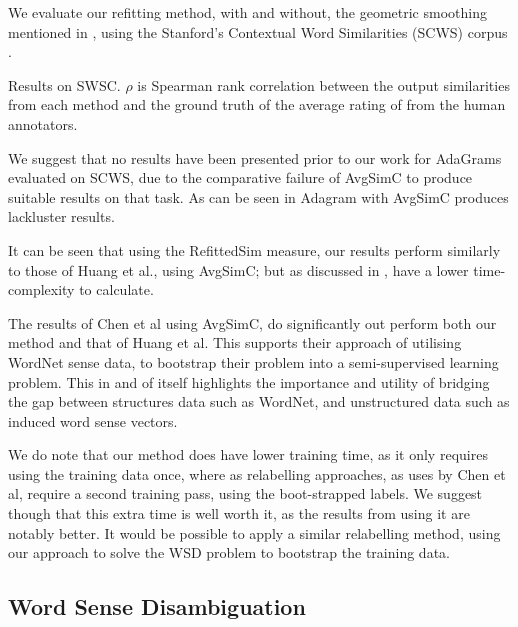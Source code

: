 \documentclass{sig-alternate}
\begin{document}
We evaluate our refitting method, with and without, the geometric smoothing mentioned in , using the Stanford's Contextual Word Similarities (SCWS) corpus \parencite{Huang2012}.

\begin{table*}

\caption{Results on SWSC. $\rho$ is Spearman rank correlation between the output similarities from each method and the ground truth of the average rating of from the human annotators. } \label{swscres}
\end{table*}


We suggest that no results have been presented prior to our work for AdaGrams evaluated on SCWS,
due to the comparative failure of AvgSimC to produce suitable results on that task. As can be seen in  Adagram with AvgSimC produces lackluster results. 

It can be seen that using the RefittedSim measure, our results perform similarly to those of Huang et al., using AvgSimC; but as discussed in , have a lower time-complexity to calculate.


The results of Chen et al using AvgSimC, do significantly out perform both our method and that of Huang et al. This supports their approach of utilising WordNet sense data, to bootstrap their problem into a semi-supervised learning problem. This in and of itself highlights the importance and utility of bridging the gap between structures data such as WordNet, and unstructured data such as induced word sense vectors.

We do note that our method does have lower training time, as it only requires using the training data once, where as relabelling approaches, as uses by Chen et al, require a second training pass, using the boot-strapped labels. We suggest though that this extra time is well worth it, as the results from using it are notably better. It would be possible to apply a similar relabelling method, using our approach to solve the WSD problem to bootstrap the training data.

\subsection{Word Sense Disambiguation}


\printbibliography
\end{document}
